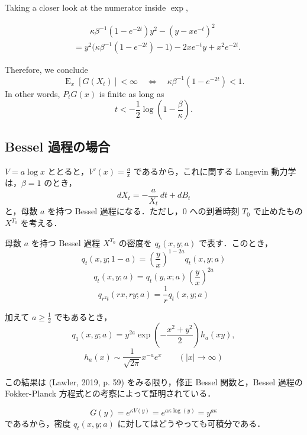 \documentclass[
]{article}
\begin{document}
Taking a closer look at the numerator inside \(\exp\),

\begin{align*}
    &\qquad\kappa\beta^{-1}(1-e^{-2t})y^2-(y-xe^{-t})^2\\
    &=y^2\biggr(\kappa\beta^{-1}(1-e^{-2t})-1\biggl)-2xe^{-t}y+x^2e^{-2t}.
\end{align*}

Therefore, we conclude \[
\operatorname{E}_x[G(X_t)]<\infty\quad\Leftrightarrow\quad\kappa\beta^{-1}(1-e^{-2t})<1.
\] In other words, \(P_tG(x)\) is finite as long as \[
t<-\frac{1}{2}\log\left(1-\frac{\beta}{\kappa}\right).
\]

\subsection{Bessel
過程の場合}\label{bessel-ux904eux7a0bux306eux5834ux5408}

\(V=a\log x\) ととると，\(V'(x)=\frac{a}{x}\) であるから，これに関する
Langevin 動力学は，\(\beta=1\) のとき， \[
dX_t=-\frac{a}{X_t}\,dt+dB_t
\] と，母数 \(a\) を持つ Bessel 過程になる．ただし，\(0\) への到着時刻
\(T_0\) で止めたもの \(X^{T_0}\) を考える．

\begin{tcolorbox}[enhanced jigsaw, opacitybacktitle=0.6, colback=white, breakable, toptitle=1mm, titlerule=0mm, left=2mm, colframe=quarto-callout-tip-color-frame, title={{[}@Lawler2019 p.10 命題2.5{]}}, colbacktitle=quarto-callout-tip-color!10!white, coltitle=black, bottomtitle=1mm, arc=.35mm, leftrule=.75mm, bottomrule=.15mm, rightrule=.15mm, opacityback=0, toprule=.15mm]

母数 \(a\) を持つ Bessel 過程 \(X^{T_0}\) の密度を \(q_t(x,y;a)\)
で表す．このとき， \[
q_t(x,y;1-a)=\left(\frac{y}{x}\right)^{1-2a}q_t(x,y;a)
\] \[
q_t(x,y;a)=q_t(y,x;a)\left(\frac{y}{x}\right)^{2a}
\] \[
q_{r^2t}(rx,ry;a)=\frac{1}{r}q_t(x,y;a)
\]

加えて \(a\ge\frac{1}{2}\) でもあるとき， \[
q_1(x,y;a)=y^{2a}\exp\left(-\frac{x^2+y^2}{2}\right)h_a(xy),
\] \[
h_a(x)\sim\frac{1}{\sqrt{2\pi}}x^{-a}e^x\qquad(\lvert x\rvert\to\infty)
\]

\end{tcolorbox}

この結果は (Lawler, 2019, p. 59) をみる限り，修正 Bessel 関数と，Bessel
過程の Fokker-Planck 方程式との考察によって証明されている．

\[
G(y)=e^{\kappa V(y)}=e^{a\kappa\log(y)}=y^{a\kappa}
\] であるから，密度 \(q_t(x,y;a)\) に対してはどうやっても可積分である．
\end{document}
